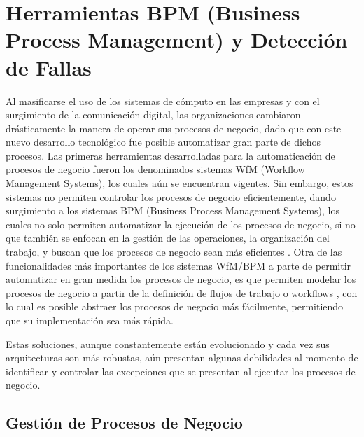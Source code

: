 
\chapter{Herramientas BPM (Business Process Management) y Detección de Fallas}  %

\ifpdf
    \graphicspath{{Chapter1/Figs/Raster/}{Chapter1/Figs/PDF/}{Chapter1/Figs/}}
\else
    \graphicspath{{Chapter1/Figs/Vector/}{Chapter1/Figs/}}
\fi

Al masificarse el uso de los sistemas de cómputo en las empresas y con el surgimiento de la comunicación digital, las organizaciones cambiaron drásticamente la manera de operar sus procesos de negocio, dado que con este nuevo desarrollo tecnológico fue posible automatizar gran parte de dichos procesos. Las primeras herramientas desarrolladas para la automaticación de procesos de negocio fueron los denominados sistemas WfM (Workflow Management Systems), los cuales aún se encuentran vigentes. Sin embargo, estos sistemas no permiten controlar los procesos de negocio eficientemente, dando surgimiento a los sistemas BPM (Business Process Management Systems), los cuales no solo permiten automatizar la ejecución de los procesos de negocio, si no que también se enfocan en la gestión de las operaciones, la organización del trabajo, y buscan que los procesos de negocio sean más eficientes \cite{VanderAalst2013,VanderAalst2016}. Otra de las funcionalidades más importantes de los sistemas WfM/BPM a parte de permitir automatizar en gran medida los procesos de negocio, es que permiten modelar los procesos de negocio a partir de la definición de flujos de trabajo o workflows \cite{VanderAalst2004}, con lo cual es posible abstraer los procesos de negocio más fácilmente, permitiendo que su implementación sea más rápida. 

Estas soluciones, aunque constantemente están evolucionado y cada vez sus arquitecturas son más robustas, aún presentan algunas debilidades al momento de identificar y controlar las excepciones que se presentan al ejecutar los procesos de negocio. 

\section{Gestión de Procesos de Negocio} %
\label{section1.1}

